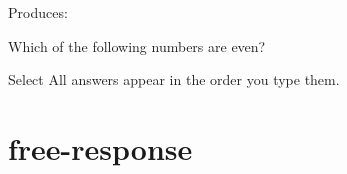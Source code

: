 \documentclass{ximera}
\begin{document}
Produces:
 
\begin{question}
  Which of the following numbers are even?
  \begin{selectAll}
  \end{selectAll}
\end{question}
 
\begin{remark}
  Select All answers appear in the order you type them.
\end{remark}
 
 
 
 
 
 
 
\section{free-response}
 
\end{document}
